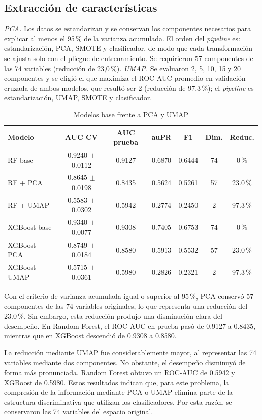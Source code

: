 \documentclass[conference]{IEEEtran}
\begin{document}
\subsection{Extracción de características}
\emph{PCA.} Los datos se estandarizan y se conservan los componentes necesarios para explicar al menos el 95\,\% de la varianza acumulada. El orden del \emph{pipeline} es: estandarización, PCA, SMOTE y clasificador, de modo que cada transformación se ajusta solo con el pliegue de entrenamiento. Se requirieron 57 componentes de las 74 variables (reducción de 23,0\,\%). \emph{UMAP.} Se evaluaron 2, 5, 10, 15 y 20 componentes y se eligió el que maximiza el ROC-AUC promedio en validación cruzada de ambos modelos, que resultó ser 2 (reducción de 97,3\,\%); el \emph{pipeline} es estandarización, UMAP, SMOTE y clasificador.

\begin{table}[!t]
\centering
\caption{Modelos base frente a PCA y UMAP}
\label{tab:red}
\footnotesize
\setlength{\tabcolsep}{0.5pt}
\begin{tabular}{@{}lcccccc@{}}
\toprule
Modelo & AUC CV & AUC prueba & auPR & F1 & Dim. & Reduc. \\
\midrule
RF base & 0.9240 $\pm$ 0.0112 & 0.9127 & 0.6870 & 0.6444 & 74 & 0\,\% \\
RF + PCA & 0.8645 $\pm$ 0.0198 & 0.8435 & 0.5624 & 0.5261 & 57 & 23.0\,\% \\
RF + UMAP & 0.5583 $\pm$ 0.0302 & 0.5942 & 0.2774 & 0.2450 & 2 & 97.3\,\% \\
XGBoost base & 0.9340 $\pm$ 0.0077 & 0.9308 & 0.7405 & 0.6753 & 74 & 0\,\% \\
XGBoost + PCA & 0.8749 $\pm$ 0.0184 & 0.8580 & 0.5913 & 0.5532 & 57 & 23.0\,\% \\
XGBoost + UMAP & 0.5715 $\pm$ 0.0361 & 0.5980 & 0.2826 & 0.2321 & 2 & 97.3\,\% \\
\bottomrule
\end{tabular}
\end{table}

Con el criterio de varianza acumulada igual o superior al 95\,\%, PCA conservó 57 componentes de las 74 variables originales, lo que representa una reducción del 23.0\,\%. Sin embargo, esta reducción produjo una disminución clara del desempeño. En Random Forest, el ROC-AUC en prueba pasó de 0.9127 a 0.8435, mientras que en XGBoost descendió de 0.9308 a 0.8580.

La reducción mediante UMAP fue considerablemente mayor, al representar las 74 variables mediante dos componentes. No obstante, el desempeño disminuyó de forma más pronunciada. Random Forest obtuvo un ROC-AUC de 0.5942 y XGBoost de 0.5980. Estos resultados indican que, para este problema, la compresión de la información mediante PCA o UMAP elimina parte de la estructura discriminativa que utilizan los clasificadores. Por esta razón, se conservaron las 74 variables del espacio original.
\end{document}
